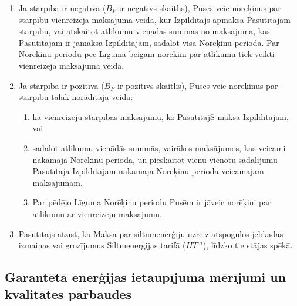 \begin{enumerate}
	\item Ja starpība ir negatīva ($B_F$ ir negatīvs skaitlis), Puses veic norēķinus par starpību vienreizēja maksājuma veidā, kur Izpildītājs apmaksā Pasūtītājam starpību, vai atskaitot atlikumu vienādās summās no maksājuma, kas Pasūtītājam ir jāmaksā Izpildītājam, sadalot visā Norēķinu periodā. Par Norēķinu periodu pēc Līguma beigām norēķini par atlikumu tiek veikti vienreizēja maksājuma veidā.

	\item Ja starpība ir pozitīva ($B_F$ ir pozitīvs skaitlis), Puses veic norēķinus par starpību tālāk norādītajā veidā:
	\begin{enumerate}
		\item kā vienreizēju starpības maksājumu, ko PasūtītājS maksā Izpildītājam, vai
		\item sadalot atlikumu vienādās summās, vairākos maksājumos, kas veicami nākamajā Norēķinu periodā, un pieskaitot vienu vienotu sadalījumu Pasūtītāja Izpildītājam nākamajā Norēķinu periodā veicamajam maksājumam.
		\item Par pēdējo Līguma Norēķinu periodu Pusēm ir jāveic norēķini par atlikumu ar vienreizēju maksājumu.
	\end{enumerate}

	\item Pasūtītājs atzīst, ka Maksa par siltumenerģiju uzreiz atspoguļos jebkādas izmaiņas vai grozījumus Siltmenerģijas tarifā ($HT^m$), līdzko tie stājas spēkā.
\end{enumerate}

\subsection{Garantētā enerģijas ietaupījuma mērījumi un kvalitātes pārbaudes}


